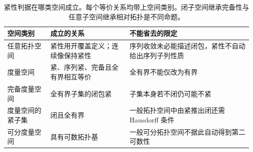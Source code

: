 \begin{table}[htbp]
\centering\small\renewcommand{\arraystretch}{1.18}\setlength{\tabcolsep}{4pt}
\caption[紧性判据在哪类空间成立]{紧性判据在哪类空间成立。每个等价关系均带上空间类别。闭子空间继承完备性与任意子空间继承相对拓扑是不同命题。}
\label{b1:tab:visual-t16}
\begin{tabularx}{\linewidth}{@{}>{\raggedright\arraybackslash}p{3.1cm}>{\raggedright\arraybackslash}p{4.7cm}>{\raggedright\arraybackslash}X@{}}
\toprule
空间类别 & 成立的关系 & 不能省去的限定 \\
\midrule
任意拓扑空间 & 紧性用开覆盖定义；连续像保持紧性 & 序列收敛未必能描述闭包，紧性不自动给出序列子列性质 \\
度量空间 & 紧、序列紧、完备且全有界相互等价 & 全有界不能仅改为有界 \\
完备度量空间 & 全有界子集的闭包紧 & 子集本身若不闭仍可能不紧 \\
度量空间的紧子集 & 闭且全有界 & 一般拓扑空间中由紧推出闭还需 Hausdorff 条件 \\
可分度量空间 & 具有可数拓扑基 & 一般可分拓扑空间不据此自动得到第二可数性 \\
\bottomrule
\end{tabularx}
\end{table}
